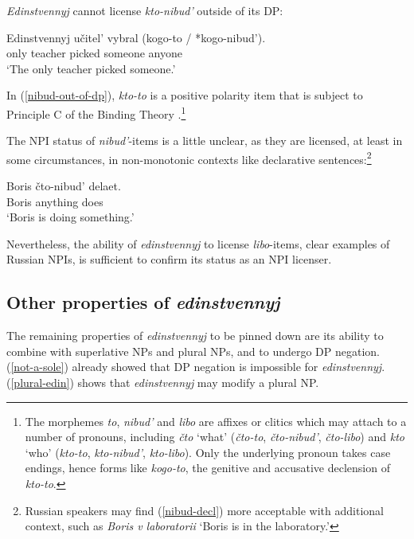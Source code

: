 \documentclass{article}
\begin{document}
\textit{Edinstvennyj} cannot license \textit{kto-nibud'} outside of its DP:

\begin{exe}
	\ex \label{nibud-out-of-dp} \gll Edinstvennyj u\v{c}itel' vybral (kogo-to / *kogo-nibud').\\
	only teacher picked someone {} anyone\\
	\glt `The only teacher picked someone.'
\end{exe}

In (\ref{nibud-out-of-dp}), \textit{kto-to}	is a positive polarity item that is subject to Principle C of the Binding Theory \citep{russneg}.\footnote{The morphemes \textit{to}, \textit{nibud'} and \textit{libo} are affixes or clitics which may attach to a number of pronouns, including \textit{\v{c}to} `what' (\textit{\v{c}to-to}, \textit{\v{c}to-nibud'}, \textit{\v{c}to-libo}) and \textit{kto} `who' (\textit{kto-to}, \textit{kto-nibud'}, \textit{kto-libo}). Only the underlying pronoun takes case endings, hence forms like \textit{kogo-to}, the genitive and accusative declension of \textit{kto-to}.}

The NPI status of \textit{nibud'}-items is a little unclear, as they are licensed, at least in some circumstances, in non-monotonic contexts like declarative sentences:\footnote{Russian speakers may find (\ref{nibud-decl}) more acceptable with additional context, such as \textit{Boris v laboratorii} `Boris is in the laboratory.'}

\begin{exe}
	\ex \label{nibud-decl} \gll Boris \v{c}to-nibud' delaet.\\
	Boris anything does\\
	\glt `Boris is doing something.' %
\end{exe}

Nevertheless, the ability of \textit{edinstvennyj} to license \textit{libo}-items, clear examples of Russian NPIs, is sufficient to confirm its status as an NPI licenser.

\subsection{Other properties of \textit{edinstvennyj}}
The remaining properties of \textit{edinstvennyj} to be pinned down are its ability to combine with superlative NPs and plural NPs, and to undergo DP negation. (\ref{not-a-sole}) already showed that DP negation is impossible for \textit{edinstvennyj}. (\ref{plural-edin}) shows that \textit{edinstvennyj} may modify a plural NP.
\end{document}
